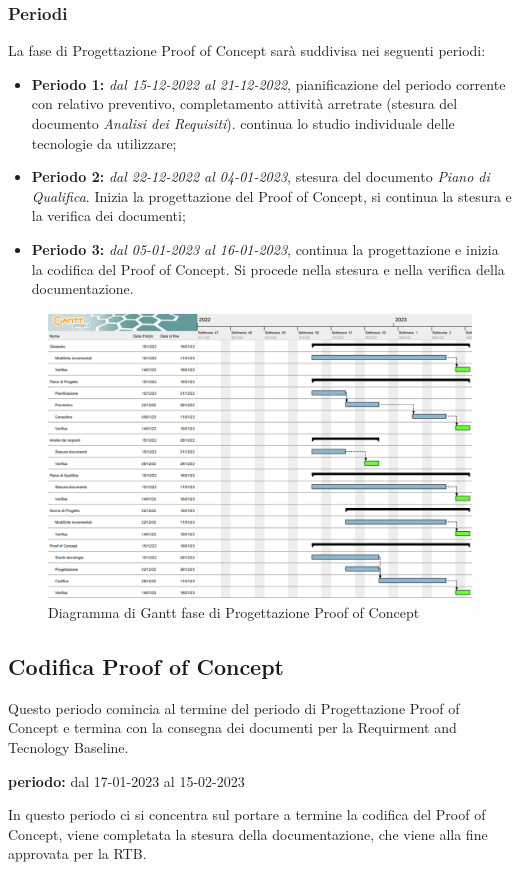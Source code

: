 \subsubsection{Periodi}
La fase di Progettazione Proof of Concept sarà suddivisa nei seguenti periodi:
\begin{itemize}
\item \textbf{Periodo 1:} \textit{dal 15-12-2022 al 21-12-2022}, pianificazione del periodo corrente con relativo preventivo, completamento attività arretrate 
(stesura del documento \textit{Analisi dei Requisiti}). continua lo studio individuale delle tecnologie da utilizzare;
\item \textbf{Periodo 2:} \textit{dal 22-12-2022 al 04-01-2023},  stesura del documento \textit{Piano di Qualifica}. Inizia la progettazione del Proof of Concept, si continua la stesura e la verifica dei documenti;
\item \textbf{Periodo 3:} \textit{dal 05-01-2023 al 16-01-2023}, continua la progettazione e inizia la codifica del Proof of Concept. Si procede nella stesura e nella verifica della documentazione.
\end{itemize}

\begin{figure}[H]
    \centering
    \includegraphics[scale=0.72]{image/gantt_poc.png}
    \caption{Diagramma di Gantt fase di Progettazione Proof of Concept}
\end{figure}
\pagebreak

\subsection{Codifica Proof of Concept}
Questo periodo comincia al termine del periodo di Progettazione Proof of Concept e termina con 
la consegna dei documenti per la Requirment and Tecnology Baseline.\\
\begin{center}
\textbf{periodo:} dal 17-01-2023 al 15-02-2023\\
\end{center}
In questo periodo ci si concentra sul portare a termine la codifica del Proof of Concept, viene completata la stesura della documentazione, che 
viene alla fine approvata per la RTB. 

